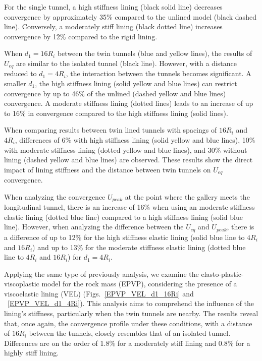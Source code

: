 \documentclass[a4paper,fleqn]{cas-sc}
\begin{document}
For the single tunnel, a high stiffness lining (black solid line) decreases convergence by approximately 35\% compared to the unlined model (black dashed line). Conversely, a moderately stiff lining (black dotted line) increases convergence by 12\% compared to the rigid lining. 

When $d_1 = 16R_i$ between the twin tunnels (blue and yellow lines), the results of $U_{eq}$ are similar to the isolated tunnel (black line). However, with a distance reduced to $d_1 = 4R_i$, the interaction between the tunnels becomes significant. A smaller $d_1$, the high stiffness lining (solid yellow and blue lines) can restrict convergence by up to 46\% of the unlined (dashed yellow and blue lines) convergence. A moderate stiffness lining (dotted lines) leads to an increase of up to 16\% in convergence compared to the high stiffness lining (solid lines).

When comparing results between twin lined tunnels with spacings of $16R_i$ and $4R_i$, differences of 6\% with high stiffness lining (solid yellow and blue lines), 10\% with moderate stiffness lining (dotted yellow and blue lines), and 30\% without lining (dashed yellow and blue lines) are observed. These results show the direct impact of lining stiffness and the distance between twin tunnels on $U_{eq}$ convergence.

When analyzing the convergence $U_{peak}$ at the point where the gallery meets the longitudinal tunnel, there is an increase of 16\% when using an moderate stiffness elastic lining (dotted blue line) compared to a high stiffness lining (solid blue line). However, when analyzing the difference between the $U_{eq}$ and $U_{peak}$, there is a difference of up to 12\% for the high stiffness elastic lining (solid blue line to $4R_i$ and $16R_i$) and up to 13\% for the moderate stiffness elastic lining (dotted blue line to $4R_i$ and $16R_i$) for $d_1=4R_i$.

Applying the same type of previously analysis, we examine the elasto-plastic-viscoplastic model for the rock mass (EPVP), considering the presence of a viscoelastic lining (VEL) (Figs.~\ref{EPVP_VEL_d1_16Ri} and ~\ref{EPVP_VEL_d1_4Ri}). This analysis aims to comprehend the influence of the lining's stiffness, particularly when the twin tunnels are nearby. The results reveal that, once again, the convergence profile under these conditions, with a distance of $16R_i$ between the tunnels, closely resembles that of an isolated tunnel. Differences are on the order of 1.8\% for a moderately stiff lining and 0.8\% for a highly stiff lining.
\end{document}
